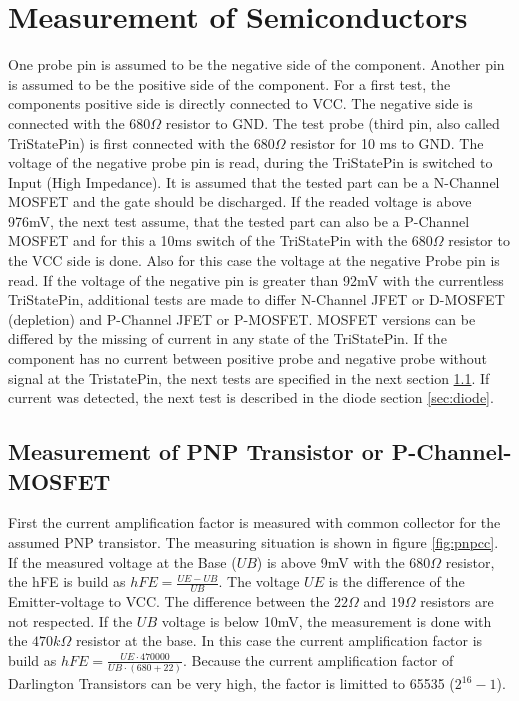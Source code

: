 \section{Measurement of Semiconductors}
One probe pin is assumed to be the negative side of the component.
Another pin is assumed to be the positive side of the component.
For a first test, the components positive side is directly connected to VCC.
The negative side is connected with the \(680\Omega\) resistor to GND.
The test probe (third pin, also called TriStatePin) is first connected with the \(680\Omega\) resistor
for 10 ms to GND. The voltage of the negative probe pin is read, during  the TriStatePin is
switched to Input (High Impedance). It is assumed that the tested part can be
a N-Channel MOSFET and the gate should be discharged.
If the readed voltage is above 976mV, the next test assume, that the tested part can
also be a P-Channel MOSFET and for this a 10ms switch of the TriStatePin with the \(680\Omega\) resistor
to the VCC side is done.
Also for this case the voltage at the negative Probe pin is read.
If the voltage of the negative pin is greater than 92mV with the
currentless TriStatePin, additional tests are made to differ N-Channel JFET or D-MOSFET (depletion)
and P-Channel JFET or P-MOSFET. MOSFET versions can be differed by the missing of current in any state
of the TriStatePin.
If the component has no current between positive probe and negative probe without signal at the
TristatePin, the next tests are specified in the next section \ref{sec:pnp}.
If current was detected, the next test is described in the diode section \ref{sec:diode}.

\subsection{Measurement of PNP Transistor or P-Channel-MOSFET}
\label{sec:pnp}
First the current amplification factor is measured with common collector for the assumed PNP transistor.
The measuring situation is shown in figure \ref{fig:pnpcc}.
If the measured voltage at the Base (\(UB\)) is above 9mV with the \(680\Omega\) resistor,
the hFE is build as \(hFE = \frac{UE-UB}{UB}\). The voltage \(UE\) is the difference of the Emitter-voltage to VCC.
The difference between the \(22\Omega\) and \(19\Omega\) resistors are not respected.
If the \(UB\) voltage is below 10mV, the measurement is done with the \(470k\Omega\) resistor at the base.
In this case the current amplification factor is build as \(hFE = \frac{UE \cdot 470000}{UB \cdot (680+22)}\).
Because the current amplification factor of Darlington Transistors can be very high, the factor is limitted 
 to 65535 (\(2^{16}-1\)). 

